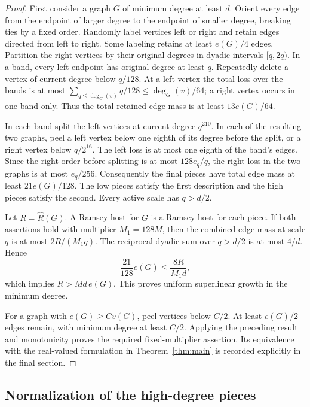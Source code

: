 \documentclass[11pt]{amsart}
\theoremstyle{definition}
\theoremstyle{remark}
\numberwithin{equation}{section}
\begin{document}
\begin{proof}
First consider a graph $G $ of minimum degree at least $ d$. Orient every
edge from the endpoint of larger degree to the endpoint of smaller degree,
breaking ties by a fixed order. Randomly label vertices left or right and
retain edges directed from left to right. Some labeling retains at least
$e(G)/4$ edges. Partition the right vertices by their original degrees in
dyadic intervals $[q,2q)$. In a band, every left endpoint has original degree
at least $q $. Repeatedly delete a vertex of current degree below $ q/128$.
At a left vertex the total loss over the bands is at most
$\sum_{q\le\deg_G(v)}q/128\le\deg_G(v)/64$; a right vertex occurs in one
band only. Thus the total retained edge mass is at least $13e(G)/64$.

In each band split the left vertices at current degree $q^{210}$. In
each of the resulting two graphs, peel a left vertex below one eighth
of its degree before the split, or a right vertex below $q/2^{16}$.
The left loss is at most one eighth of the band's edges. Since the right
order before splitting is at most $128e_q/q$, the right loss in the two
graphs is at most $e_q/256$. Consequently the final pieces have total
edge mass at least $21e(G)/128$. The low pieces satisfy the first
description and the high pieces satisfy the second. Every active scale
has $q>d/2$.

Let $R=\widehat R(G)$. A Ramsey host for $ G$ is a Ramsey host for each
piece. If both assertions hold with multiplier $M_1=128M$, then the
combined edge mass at scale $q $ is at most $2R/(M_1q)$. The reciprocal
dyadic sum over $q>d/2$ is at most $4/d$. Hence
\[
 \frac{21}{128}e(G)\le \frac{8R}{M_1d},
\]
which implies $R>Md\,e(G)$. This proves uniform superlinear growth in
the minimum degree.

For a graph with $e(G)\ge C v(G)$, peel vertices below $ C/2$.
At least $e(G)/2$ edges remain, with minimum degree at least $ C/2$.
Applying the preceding result and monotonicity proves the required
fixed-multiplier assertion. Its equivalence with the real-valued
formulation in Theorem~\ref{thm:main} is recorded explicitly in the final
section.
\end{proof}

\subsection{Normalization of the high-degree pieces}
\end{document}

